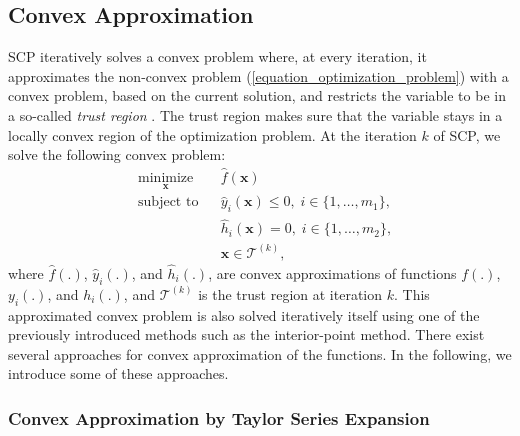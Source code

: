 \documentclass[lang=cn,10pt]{gorgeousnbook}
\numberwithin{equation}{section}%
\numberwithin{figure}{section}%
\begin{document}
\subsection{Convex Approximation}

SCP iteratively solves a convex problem where, at every iteration, it approximates the non-convex problem (\ref{equation_optimization_problem}) with a convex problem, based on the current solution, and restricts the variable to be in a so-called \textit{trust region} \cite{conn2000trust}. The trust region makes sure that the variable stays in a locally convex region of the optimization problem. At the iteration $k$ of SCP, we solve the following convex problem:
\begin{equation}\label{equation_optimization_problem_SCP}
\begin{aligned}
& \underset{\boldsymbol{x}}{\text{minimize}}
& & \widehat{f}(\boldsymbol{x}) \\
& \text{subject to}
& & \widehat{y}_i(\boldsymbol{x}) \leq 0, \; i \in \{1, \ldots, m_1\}, \\
& & & \widehat{h}_i(\boldsymbol{x}) = 0, \; i \in \{1, \ldots, m_2\}, \\
& & & \boldsymbol{x} \in \mathcal{T}^{(k)},
\end{aligned}
\end{equation}
where $\widehat{f}(.)$, $\widehat{y}_i(.)$, and $\widehat{h}_i(.)$, are convex approximations of functions $f(.)$, $y_i(.)$, and $h_i(.)$, and $\mathcal{T}^{(k)}$ is the trust region at iteration $k$. 
This approximated convex problem is also solved iteratively itself using one of the previously introduced methods such as the interior-point method. 
There exist several approaches for convex approximation of the functions. In the following, we introduce some of these approaches. 

\subsubsection{Convex Approximation by Taylor Series Expansion}
\end{document}
